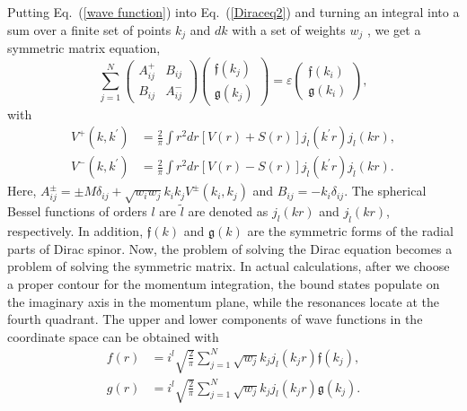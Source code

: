 \documentclass[twocolumn,prc,preprintnumbers,superscriptaddress,floatfix,showpacs]{revtex4}
\begin{document}
Putting Eq.~(\ref{wave function}) into Eq.~(\ref{Diraceq2}) and turning an integral into a sum over a finite set of points $k_{j}$ and $dk$ with a set of weights $w_{j}$ \cite{Li2016}, we get a symmetric matrix equation,
\begin{equation}
\sum\limits_{j=1}^{N}\left(
\begin{array}{cc}
A_{ij}^{+} & B_{ij} \\
B_{ij} & A_{ij}^{-}%
\end{array}%
\right) \left(
\begin{array}{c}
\mathfrak{f}(k_{j}) \\
\mathfrak{g}(k_{j})%
\end{array}%
\right) =\varepsilon \left(
\begin{array}{c}
\mathfrak{f}(k_{i}) \\
\mathfrak{g}(k_{i})%
\end{array}%
\right) ,
\end{equation}
with
\begin{subequations}
\begin{align}
V^{+}\left( k,k^{\prime }\right) & =\frac{2}{\pi }\int r^{2}dr\left[ V\left(
r\right) +S\left( r\right) \right] j_{l}\left( k^{\prime }r\right)
j_{l}\left( kr\right) , \\
V^{-}\left( k,k^{\prime }\right) & =\frac{2}{\pi }\int r^{2}dr\left[ V\left(
r\right) -S\left( r\right) \right] j_{\tilde{l}}\left( k^{\prime }r\right)
j_{\tilde{l}}\left( kr\right).
\end{align}
\end{subequations}
Here, $A_{ij}^{\pm }={\pm }M\delta _{ij}+\sqrt{w_{i}w_{j}} k_{i}k_{j}V^{\pm }\left( k_{i},k_{j}\right) $ and $B_{ij}=-k_{i}\delta _{ij}$. The spherical Bessel functions of orders $l$ are $\tilde{l}$ are denoted as $j_{l}(kr)$ and $j_{\tilde{l}}(kr)$, respectively. In addition, $\mathfrak{f}(k)$ and $\mathfrak{g}(k)$ are the symmetric forms of the radial parts of Dirac spinor. Now, the problem of solving the Dirac equation becomes a problem of solving the symmetric matrix. In actual calculations, after we choose a proper contour for the momentum integration, the bound states populate on the imaginary axis in the momentum plane, while the resonances locate at the fourth quadrant. The upper and lower components of wave functions in the coordinate space can be obtained with
\begin{subequations}
\begin{align}
f(r) &=i^{l}\sqrt{\frac{2}{\pi }}\sum\limits_{j=1}^{N}\sqrt{w_{j}}%
k_{j}j_{l}(k_{j}r)\mathfrak{f}(k_{j}), \\
g(r) &=i^{l}\sqrt{\frac{2}{\pi }}\sum\limits_{j=1}^{N}\sqrt{w_{j}}%
k_{j}j_{l}(k_{j}r)\mathfrak{g}(k_{j}).
\end{align}
\end{subequations}
\end{document}
